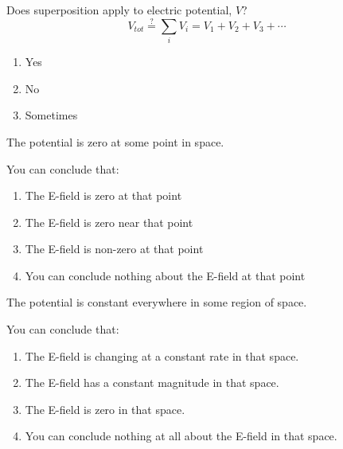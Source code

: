 \documentclass[pdf,aspectratio=169]{beamer}
\begin{document}

\begin{frame}{}
	Does superposition apply to electric potential, $V$?
	\[V_{tot} \overset{?}{=} \sum_i V_i = V_1 + V_2 + V_3 + \cdots\]
	\begin{enumerate}
		\item \alert<2>{Yes}
		\item No
		\item Sometimes
	\end{enumerate}
\end{frame}

\begin{frame}{}
	The potential is zero at some point in space.

	You can conclude that:
	\begin{enumerate}
		\item The E-field is zero at that point
		\item The E-field is zero near that point
		\item The E-field is non-zero at that point
		\item \alert<2>{You can conclude nothing about the E-field at that point}
	\end{enumerate}
\end{frame}

\begin{frame}{}
	The potential is constant everywhere in some region of space.

	You can conclude that:
	\begin{enumerate}
		\item The E-field is changing at a constant rate in that space.
		\item The E-field has a constant magnitude in that space.
		\item \alert<2>{The E-field is zero in that space.}
		\item You can conclude nothing at all about the E-field in that space.
	\end{enumerate}
\end{frame}
\end{document}
